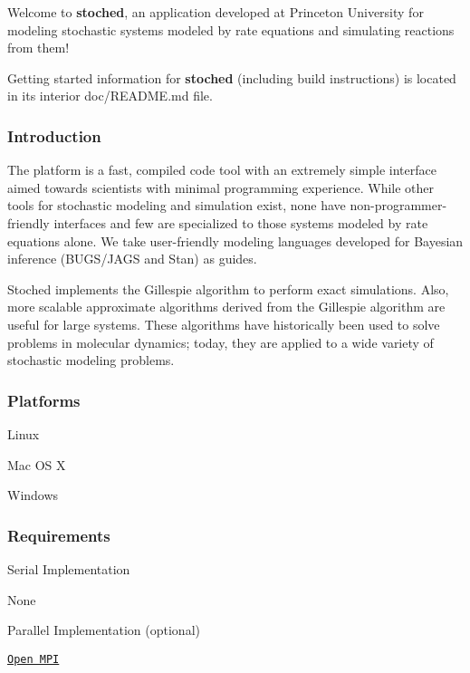 Welcome to {\bfseries stoched}, an application developed at Princeton University for modeling stochastic systems modeled by rate equations and simulating reactions from them!

Getting started information for {\bfseries stoched} (including build instructions) is located in its interior doc/\+R\+E\+A\+D\+M\+E.\+md file.

\subsubsection*{Introduction}

The platform is a fast, compiled code tool with an extremely simple interface aimed towards scientists with minimal programming experience. While other tools for stochastic modeling and simulation exist, none have non-\/programmer-\/friendly interfaces and few are specialized to those systems modeled by rate equations alone. We take user-\/friendly modeling languages developed for Bayesian inference (B\+U\+G\+S/\+J\+A\+GS and Stan) as guides.

Stoched implements the Gillespie algorithm to perform exact simulations. Also, more scalable approximate algorithms derived from the Gillespie algorithm are useful for large systems. These algorithms have historically been used to solve problems in molecular dynamics; today, they are applied to a wide variety of stochastic modeling problems.

\subsubsection*{Platforms}


\begin{DoxyItemize}
\item Linux
\item Mac OS X
\item Windows
\end{DoxyItemize}

\subsubsection*{Requirements}

Serial Implementation
\begin{DoxyItemize}
\item None
\end{DoxyItemize}

Parallel Implementation (optional)
\begin{DoxyItemize}
\item \href{https://www.open-mpi.org/}{\tt Open M\+PI}
\end{DoxyItemize}

